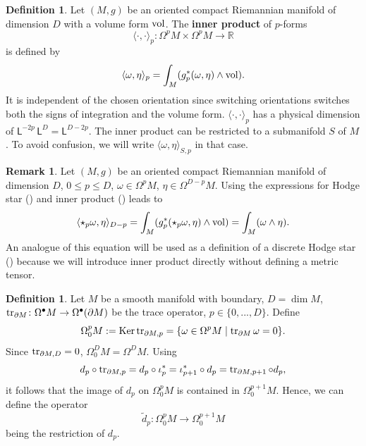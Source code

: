 \documentclass{elsarticle}
\theoremstyle{definition}
\newtheorem{definition}[theorem]{Definition}
\newtheorem{remark}[theorem]{Remark}
\newcommand{\inner}[2]{\langle#1,#2\rangle}
\newcommand{\tr}{\mathop{\rm tr}\nolimits}
\newcommand{\Ker}{\mathop{\rm Ker}\nolimits}
\newcommand{\vol}{\mathop{\rm vol}\nolimits}
\newcommand{\R}{\mathbb{R}}
\newcommand{\set}[2]{\{#1 \mid #2\}}
\newcommand{\newterm}[1]{\textbf{#1}}
\newcommand{\length}{\mathsf{L}}
\begin{document}
\begin{definition}
  Let $(M, g)$ be an oriented compact Riemannian manifold of dimension $D$ with a volume form $\vol$.
  The \newterm{inner product} of $p$-forms
  \begin{equation}
    \inner{\cdot}{\cdot}_p \colon \Omega^p M \times \Omega^p M \to \R
  \end{equation}
  is defined by
  \begin{equation}
    \label{eq:exterior_calculus/inner_product}
    \inner{\omega}{\eta}_p = \int_M (g^*_p(\omega, \eta) \wedge \vol).
  \end{equation}
  It is independent of the chosen orientation since switching orientations switches both the signs of integration and the volume form.
  $\inner{\cdot}{\cdot}_p$ has a physical dimension of $\length^{-2p}\, \length^D = \length^{D - 2 p}$.
  The inner product can be restricted to a submanifold $S$ of $M$.
  To avoid confusion, we will write $\inner{\omega}{\eta}_{S, p}$ in that case.
\end{definition}
\begin{remark}
  Let $(M, g)$ be an oriented compact Riemannian manifold of dimension $D$, $0 \leq p \leq D$,
  $\omega \in \Omega^p M$,
  $\eta \in \Omega^{D - p} M$.
  Using the expressions for Hodge star () and inner product () leads to
  \begin{equation}
    \label{eq:exterior_calculus/inner_product_with_hodge_star}
    \inner{\star_p \omega}{\eta}_{D - p}
    = \int_M (g^*_p(\star_p \omega, \eta) \wedge \vol)
    =\int_M (\omega \wedge \eta).
  \end{equation}
  An analogue of this equation will be used as a definition of a discrete Hodge star () because we will introduce inner product directly without defining a metric tensor.
\end{remark}
\begin{definition}
  Let $M$ be a smooth manifold with boundary, $D = \dim M$, $\tr_{\partial M} \colon \Omega^\bullet M \to \Omega^\bullet(\partial M)$ be the trace operator, $p \in \{0, ..., D\}$.
  Define
  \begin{equation}
    \Omega^p_0 M := \Ker \tr_{\partial M, p} = \set{\omega \in \Omega^p M}{\tr_{\partial M} \omega = 0}.
  \end{equation}
  Since $\tr_{\partial M, D} = 0$, $\Omega^D_0 M = \Omega^D M$.
  Using
  \begin{equation}
    d_p \circ \tr_{\partial M, p}
    = d_p \circ \iota^*_p
    = \iota^*_{p + 1} \circ d_p
    = \tr_{\partial M, p + 1} \circ d_p,
  \end{equation}
  it follows that the image of $d_p$ on $\Omega^p_0 M$ is contained in $\Omega^{p + 1}_0 M$.
  Hence, we can define the operator
  \begin{equation}
    \tilde{d}_p \colon \Omega^p_0 M \to \Omega^{p + 1}_0 M
  \end{equation}
  being the restriction of $d_p$.
\end{definition}
\end{document}
